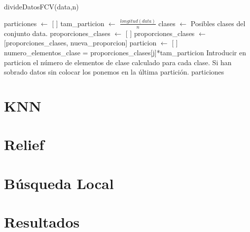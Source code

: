 \documentclass[12pt,a4paper]{article}
\begin{document}
	\begin{algorithm}
		\caption{divideDatosFCV(data,n)}
		\begin{algorithmic}
			\STATE particiones $\leftarrow$ [ ]
			\STATE tam\_particion $\leftarrow$ $\frac{longitud(data)}{n}$
			\STATE clases $\leftarrow$ Posibles clases del conjunto data.
			\STATE proporciones\_clases $\leftarrow$ [ ]
				\STATE proporciones\_clases $\leftarrow$ [proporciones\_clases, nueva\_proporcion]
			\ENDFOR
				\STATE particion $\leftarrow$ [ ]
					\STATE numero\_elementos\_clase = proporciones\_clases[j]*tam\_particion
						\STATE Introducir en particion el número de elementos de clase calculado para cada clase.
					\ENDFOR
				\ENDFOR
			\ENDFOR
			\STATE Si han sobrado datos sin colocar los ponemos en la última partición.
			\RETURN particiones
		\end{algorithmic}
	\end{algorithm}

	\section{KNN}
	\label{sec:knn}



	\section{Relief}
	\label{sec:relief}



	\section{Búsqueda Local}
	\label{sec:bl}



	\section{Resultados}
	\label{sec:resultados}
\end{document}
